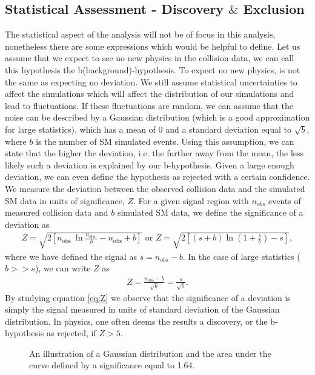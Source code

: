 \subsection{Statistical Assessment - Discovery $\&$ Exclusion}\label{subsec:Sensitivity}
The statistical aspect of the analysis will not be of focus in this analysis, nonetheless there are 
some expressions which would be helpful to define. Let us assume that we expect to see no new physics in the collision
data, we can call this hypothesis the b(background)-hypothesis. To expect no new physics, is not the same as expecting no 
deviation. We still assume statistical uncertainties to affect the simulations which will affect the distribution of our 
simulations and lead to fluctuations. If these fluctuations are random, we can assume that the noise can be described by a Gaussian distribution 
(which is a good approximation for large statistics), which has a mean of 0 and a standard deviation equal to $\sqrt{b}$, where $b$ is 
the number of \ac{SM} simulated events. Using this assumption, we can state that the higher the deviation, i.e. the further away 
from the mean, the less likely such a deviation is explained by our b-hypothesis. Given a large enough deviation, we can even 
define the hypothesis as rejected with a certain confidence.
\\
We measure the deviation between the observed collision data and the simulated \ac{SM} data in units of significance, $Z$. 
For a given signal region with $n_{obs}$ events of measured collision data and $b$ simulated \ac{SM} data, we define
the significance of a deviation as
\begin{align}\label{eq:Z1}
Z=\sqrt{2\left[n_{\text {obs }} \ln \frac{n_{\text {obs }}}{b}-n_{\mathrm{obs}}+b\right]} \text { or } 
Z=\sqrt{2\left[(s+b) \ln \left(1+\frac{s}{b}\right)-s\right]}, 
\end{align}
where we have defined the signal as $s = n_{obs} - b$. In the case of large statistics ($b>>s$), we can write $Z$
as 
\begin{align}\label{eq:Z}
    Z=\frac{n_{o b s}-b}{\sqrt{b}} = \frac{s}{\sqrt{b}}.
\end{align}
By studying equation \ref{eq:Z} we observe that the significance of a deviation is simply the signal measured in units of standard
deviation of the Gaussian distribution. In physics, one often deems the results a discovery, or the b-hypothesis as rejected, if $Z>5$. 
\\
\begin{figure}[H]
    \centering
    \caption{An illustration of a Gaussian distribution and the area under the curve defined by a significance equal to 1.64.}
    \label{fig:ConfInt}
\end{figure}
